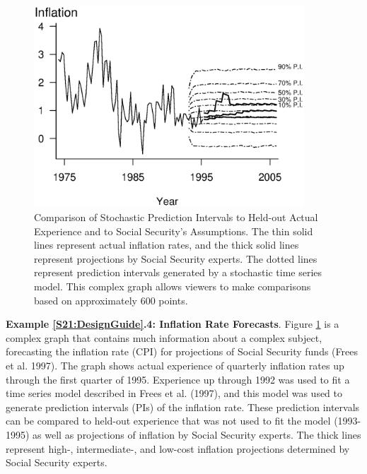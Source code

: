 \begin{figure}[htp]
  \begin{center}
    \includegraphics[width=0.9\textwidth]
        {Chapter21Graphs/Fig21_10InflationWithProjections.eps}
    \caption{\label{F21:InflationWithProjections} \small Comparison of Stochastic Prediction Intervals to Held-out Actual
Experience and to Social Security's Assumptions. The thin solid
lines represent actual inflation rates, and the thick solid lines
represent projections by Social Security experts. The dotted lines
represent prediction intervals generated by a stochastic time series
model. This complex graph allows viewers to make comparisons based
on approximately 600 points.}
  \end{center}
\end{figure}

\linejed

\textbf{Example \ref{S21:DesignGuide}.4: Inflation Rate Forecasts}.
Figure \ref{F21:InflationWithProjections} is a complex graph that
contains much information about a complex subject, forecasting the
inflation rate (CPI) for projections of Social Security funds (Frees
et al. 1997). The graph shows actual experience of quarterly
inflation rates up through the first quarter of 1995. Experience up
through 1992 was used to fit a time series model described in Frees
et al. (1997), and this model was used to generate prediction
intervals (PIs) of the inflation rate. These prediction intervals
can be compared to held-out experience that was not used to fit the
model (1993-1995) as well as projections of inflation by Social
Security experts. The thick lines represent high-, intermediate-,
and low-cost inflation projections determined by Social Security
experts.

